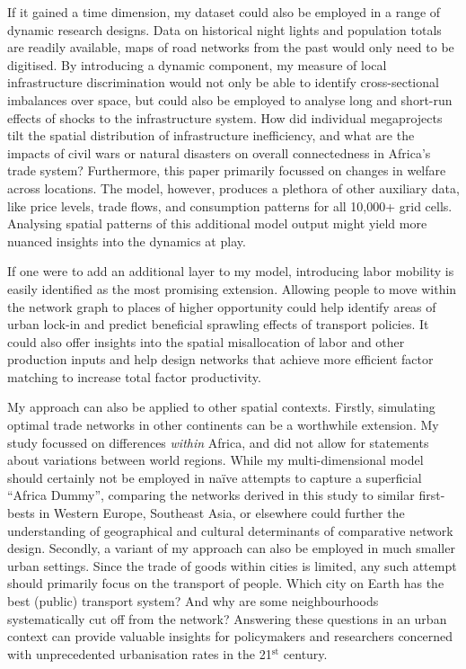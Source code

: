 \documentclass[11pt, oneside]{article}   	%
\begin{document}
If it gained a time dimension, my dataset could also be employed in a range of dynamic research designs. Data on historical night lights and population totals are readily available, maps of road networks from the past would only need to be digitised. By introducing a dynamic component, my measure of local infrastructure discrimination would not only be able to identify cross-sectional imbalances over space, but could also be employed to analyse long and short-run effects of shocks to the infrastructure system. How did individual megaprojects tilt the spatial distribution of infrastructure inefficiency, and what are the impacts of civil wars or natural disasters on overall connectedness in Africa's trade system? Furthermore, this paper primarily focussed on changes in welfare across locations. The model, however, produces a plethora of other auxiliary data, like price levels, trade flows, and consumption patterns for all 10,000+ grid cells. Analysing spatial patterns of this additional model output might yield more nuanced insights into the dynamics at play.

If one were to add an additional layer to my model, introducing labor mobility is easily identified as the most promising extension. Allowing people to move within the network graph to places of higher opportunity could help identify areas of urban lock-in and predict beneficial sprawling effects of transport policies. It could also offer insights into the spatial misallocation of labor and other production inputs and help design networks that achieve more efficient factor matching to increase total factor productivity.

My approach can also be applied to other spatial contexts. Firstly, simulating optimal trade networks in other continents can be a worthwhile extension. My study focussed on differences \emph{within} Africa, and did not allow for statements about variations between world regions. While my multi-dimensional model should certainly not be employed in naïve attempts to capture a superficial ``Africa Dummy'', comparing the networks derived in this study to similar first-bests in Western Europe, Southeast Asia, or elsewhere could further the understanding of geographical and cultural determinants of comparative network design. Secondly, a variant of my approach can also be employed in much smaller urban settings. Since the trade of goods within cities is limited, any such attempt should primarily focus on the transport of people. Which city on Earth has the best (public) transport system? And why are some neighbourhoods systematically cut off from the network? Answering these questions in an urban context can provide valuable insights for policymakers and researchers concerned with unprecedented urbanisation rates in the 21$^{\textrm{st}}$ century.
\end{document}

